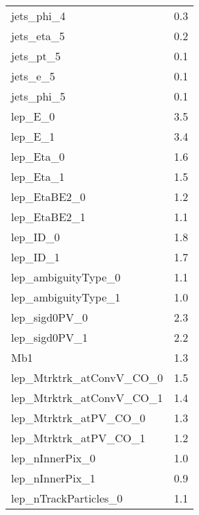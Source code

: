 \begin{longtable}{ll}
    jets\_phi\_4                 & 0.3                          \\
    jets\_eta\_5                 & 0.2                          \\
    jets\_pt\_5                  & 0.1                          \\
    jets\_e\_5                   & 0.1                          \\
    jets\_phi\_5                 & 0.1                          \\
    lep\_E\_0                    & 3.5                          \\
    lep\_E\_1                    & 3.4                          \\
    lep\_Eta\_0                  & 1.6                          \\
    lep\_Eta\_1                  & 1.5                          \\
    lep\_EtaBE2\_0               & 1.2                          \\
    lep\_EtaBE2\_1               & 1.1                          \\
    lep\_ID\_0                   & 1.8                          \\
    lep\_ID\_1                   & 1.7                          \\
    lep\_ambiguityType\_0        & 1.1                          \\
    lep\_ambiguityType\_1        & 1.0                          \\
    lep\_sigd0PV\_0              & 2.3                          \\
    lep\_sigd0PV\_1              & 2.2                          \\
    Mb1                          & 1.3                          \\
    lep\_Mtrktrk\_atConvV\_CO\_0 & 1.5                          \\
    lep\_Mtrktrk\_atConvV\_CO\_1 & 1.4                          \\
    lep\_Mtrktrk\_atPV\_CO\_0    & 1.3                          \\
    lep\_Mtrktrk\_atPV\_CO\_1    & 1.2                          \\
    lep\_nInnerPix\_0            & 1.0                          \\
    lep\_nInnerPix\_1            & 0.9                          \\
    lep\_nTrackParticles\_0      & 1.1                          \\

\end{longtable}

